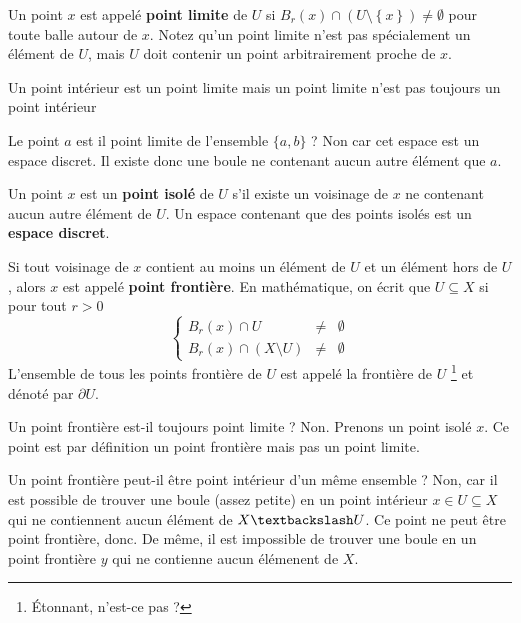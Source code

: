\begin{definition}
    Un point $x$ est appelé \textbf{point limite} de $U$ si $B_r(x)\cap \left(U\setminus \left\{x\right\}\right)\neq\emptyset$ pour toute balle autour de $x$. Notez qu'un point limite n'est pas spécialement un élément de $U$, mais $U$ doit contenir un point arbitrairement proche de $x$.
\end{definition}

\begin{remark}
    Un point intérieur est un point limite mais un point limite n'est pas toujours un point intérieur
\end{remark}

\begin{example}
    Le point $a$ est il point limite de l'ensemble $\{a,b\}$ ? Non car cet espace est un espace discret. Il existe donc une boule ne contenant aucun autre élément que $a$.
\end{example}

\begin{definition}
    Un point $x$ est un \textbf{point isolé} de $U$ s'il existe un voisinage de $x$ ne contenant aucun autre élément de $U$. Un espace contenant que des points isolés est un \textbf{espace discret}.
\end{definition}

\begin{definition}
    Si tout voisinage de $x$ contient au moins un élément de $U$ et un élément hors de $U$, alors $x$ est appelé \textbf{point frontière}. En mathématique, on écrit que $U\subseteq X$ si pour tout $r>0$
    \begin{equation*}
        \left\{\begin{array}{rcl}
            B_r(x)\cap U &\neq& \emptyset  \\
            B_r(x)\cap (X\setminus U) &\neq& \emptyset
        \end{array}\right.
    \end{equation*}
    L'ensemble de tous les points frontière de $U$ est appelé la frontière de $U$ \footnote{Étonnant, n'est-ce pas ?} et dénoté par $\partial U$.
\end{definition}

Un point frontière est-il toujours point limite ? Non. Prenons un point isolé $x$. Ce point est par définition un point frontière mais pas un point limite.

Un point frontière peut-il être point intérieur d'un même ensemble ? Non, car il est possible de trouver une boule (assez petite) en un point intérieur $x\in U\subseteq X$ qui ne contiennent aucun élément de $X \textbackslash U$. Ce point ne peut être point frontière, donc. De même, il est impossible de trouver une boule en un point frontière $y$ qui ne contienne aucun élémenent de $X$.

